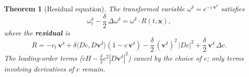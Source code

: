 \documentclass[11pt]{article}
\newtheorem{theorem}{Theorem}
\newcommand{\bx}{\bm{x}}
\newcommand{\bv}{\bm{v}}
\begin{document}
\begin{theorem}[Residual equation]\label{thm:residual}
  The transformed variable $\omega^\delta = e^{-c\,\bv^\delta}$ satisfies
  \begin{equation}\label{eq:residual}
    \omega_t^\delta - \frac{\delta}{2}\,\Delta\omega^\delta
    = \omega^\delta\cdot R(t,\bx),
  \end{equation}
  where the \textbf{residual} is
  \begin{equation}\label{eq:R}
    R = -c_t\,\bv^\delta
      + \delta\langle Dc, D\bv^\delta\rangle(1 - c\,\bv^\delta)
      - \frac{\delta}{2}\,(\bv^\delta)^2\,|Dc|^2
      + \frac{\delta}{2}\,\bv^\delta\,\Delta c.
  \end{equation}
  The leading-order terms ($cH - \frac{\delta}{2}c^2|D\bv^\delta|^2$) cancel
  by the choice of $c$; only terms involving derivatives of $c$ remain.
\end{theorem}
\end{document}
